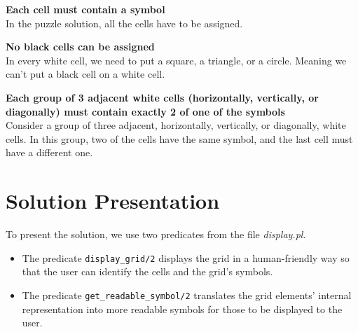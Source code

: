 \documentclass[runningheads]{llncs}
\begin{document}
\textbf{Each cell must contain a symbol} \\
In the puzzle solution, all the cells have to be assigned.

\textbf{No black cells can be assigned} \\
In every white cell, we need to put a square, a triangle, or a circle.
Meaning we can't put a black cell on a white cell.

\textbf{Each group of 3 adjacent white cells (horizontally, vertically, or diagonally)
    must contain exactly 2 of one of the symbols} \\
Consider a group of three adjacent, horizontally, vertically, or diagonally, white cells.
In this group, two of the cells have the same symbol, and the last cell must have a different one.

\section{Solution Presentation}
To present the solution, we use two predicates from the file \textit{display.pl}.
\begin{itemize}
    \item The predicate \verb|display_grid/2| displays the grid in a human-friendly way so that
        the user can identify the cells and the grid's symbols.
    \item The predicate \verb|get_readable_symbol/2| translates the grid elements' internal representation
        into more readable symbols for those to be displayed to the user.
\end{itemize}
\end{document}
